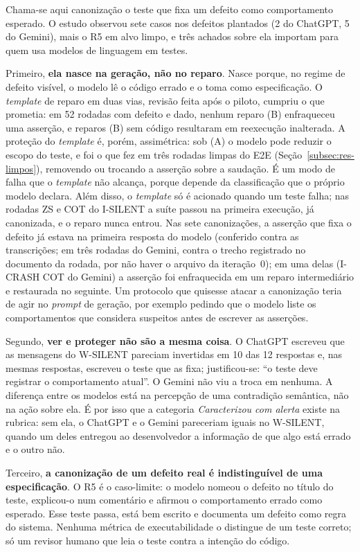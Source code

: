 \documentclass[12pt]{article}
\begin{document}
Chama-se aqui canonização o teste que fixa um defeito como comportamento
esperado. O estudo observou sete casos nos defeitos plantados (2 do ChatGPT,
5 do Gemini), mais o R5 em alvo limpo, e três achados sobre ela importam para quem usa modelos de
linguagem em testes.

Primeiro, \textbf{ela nasce na geração, não no reparo}. Nasce porque,
no regime de defeito visível, o modelo lê o código errado e o toma como
especificação. O \textit{template}
de reparo em duas vias, revisão feita após o piloto, cumpriu o que
prometia: em 52 rodadas com defeito e dado, nenhum
reparo (B) enfraqueceu uma asserção, e reparos (B) sem código resultaram em
reexecução inalterada. A proteção do \textit{template} é, porém,
assimétrica: sob (A) o modelo pode reduzir o escopo do teste, e foi o que fez
em três rodadas limpas do E2E (Seção~\ref{subsec:res-limpos}), removendo ou
trocando a asserção sobre a saudação. É um modo de falha que o
\textit{template} não alcança, porque depende da classificação que o
próprio modelo declara. Além disso, o \textit{template} só é acionado quando
um teste falha; nas rodadas ZS e COT do I-SILENT a suíte passou na primeira
execução, já canonizada, e o reparo nunca entrou. Nas sete canonizações, a
asserção que fixa o defeito já estava na primeira resposta do modelo
(conferido contra as transcrições; em três rodadas do Gemini, contra o
trecho registrado no documento da rodada, por não haver o arquivo da
iteração~0); em uma delas (I-CRASH COT do Gemini) a asserção foi
enfraquecida em um reparo intermediário e restaurada no seguinte. Um protocolo que quisesse
atacar a canonização teria de agir no \textit{prompt} de geração, por
exemplo pedindo que o modelo liste os comportamentos que considera
suspeitos antes de escrever as asserções.

Segundo, \textbf{ver e proteger não são a mesma coisa}. O ChatGPT escreveu
que as mensagens do W-SILENT pareciam invertidas em 10 das 12 respostas e,
nas mesmas respostas, escreveu o teste que as fixa; justificou-se: ``o
teste deve registrar o comportamento atual''. O Gemini não viu a troca em
nenhuma. A diferença entre os modelos está na percepção de uma contradição
semântica, não na ação sobre ela. É por isso que a categoria
\emph{Caracterizou com alerta} existe na rubrica: sem ela, o ChatGPT e o
Gemini pareceriam iguais no W-SILENT, quando um deles entregou ao
desenvolvedor a informação de que algo está errado e o outro não.

Terceiro, \textbf{a canonização de um defeito real é indistinguível de uma
especificação}. O R5 é o caso-limite: o modelo nomeou o defeito no título do
teste, explicou-o num comentário e afirmou o comportamento errado como
esperado. Esse teste passa, está bem escrito e documenta um defeito como
regra do sistema. Nenhuma métrica de executabilidade o distingue de um teste
correto; só um revisor humano que leia o teste contra a intenção do código.
\end{document}
